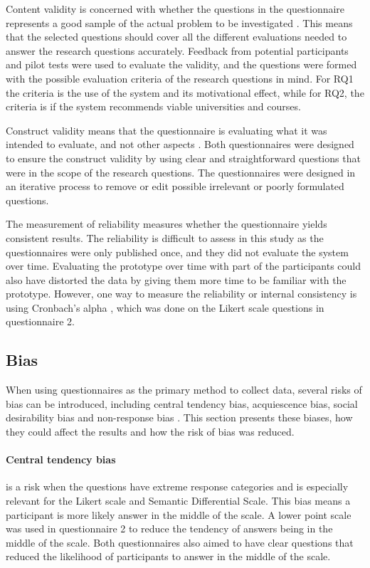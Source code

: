 Content validity is concerned with whether the questions in the questionnaire represents a good sample of the actual problem to be investigated \cite{oates2005researching}. This means that the selected questions should cover all the different evaluations needed to answer the research questions accurately. Feedback from potential participants and pilot tests were used to evaluate the validity, and the questions were formed with the possible evaluation criteria of the research questions in mind. For RQ1 the criteria is the use of the system and its motivational effect, while for RQ2, the criteria is if the system recommends viable universities and courses.

Construct validity means that the questionnaire is evaluating what it was intended to evaluate, and not other aspects \cite{oates2005researching}. Both questionnaires were designed to ensure the construct validity by using clear and straightforward questions that were in the scope of the research questions. The questionnaires were designed in an iterative process to remove or edit possible irrelevant or poorly formulated questions. 

The measurement of reliability measures whether the questionnaire yields consistent results. The reliability is difficult to assess in this study as the questionnaires were only published once, and they did not evaluate the system over time. Evaluating the prototype over time with part of the participants could also have distorted the data by giving them more time to be familiar with the prototype. However, one way to measure the reliability or internal consistency is using Cronbach's alpha \cite{bland1997statistics}, which was done on the Likert scale questions in questionnaire 2.

\subsection{Bias}

When using questionnaires as the primary method to collect data, several risks of bias can be introduced, including central tendency bias, acquiescence bias, social desirability bias and non-response bias \cite{furnham1986response}. This section presents these biases, how they could affect the results and how the risk of bias was reduced.  

\paragraph{Central tendency bias} is a risk when the questions have extreme response categories and is especially relevant for the Likert scale and Semantic Differential Scale. This bias means a participant is more likely answer in the middle of the scale. A lower point scale was used in questionnaire 2 to reduce the tendency of answers being in the middle of the scale. Both questionnaires also aimed to have clear questions that reduced the likelihood of participants to answer in the middle of the scale.


